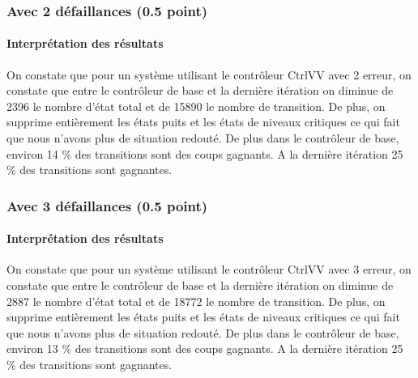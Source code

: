 \documentclass[a4paper]{book}
\begin{document}
\subsubsection{Avec 2 défaillances (0.5 point)}




%
\paragraph{Interprétation des résultats}
\begin{flushleft}
    On constate que pour un système utilisant le contrôleur CtrlVV avec 2 erreur, on constate que entre le contrôleur de base et la dernière itération on diminue de 2396 le nombre d'état total
    et de 15890 le nombre de transition. De plus, on supprime entièrement les états puits et les états de niveaux critiques ce qui fait que nous n'avons plus de situation redouté. 
    De plus dans le contrôleur de base, environ 14 \% des transitions sont des coups gagnants.
    A la dernière itération 25 \% des transitions sont gagnantes.
    
\end{flushleft}

\subsubsection{Avec 3 défaillances (0.5 point)}




%
\paragraph{Interprétation des résultats}
\begin{flushleft}
    On constate que pour un système utilisant le contrôleur CtrlVV avec 3 erreur, on constate que entre le contrôleur de base et la dernière itération on diminue de 2887 le nombre d'état total
    et de 18772 le nombre de transition. De plus, on supprime entièrement les états puits et les états de niveaux critiques ce qui fait que nous n'avons plus de situation redouté. 
    De plus dans le contrôleur de base, environ 13 \% des transitions sont des coups gagnants.
    A la dernière itération 25 \% des transitions sont gagnantes.
    
\end{flushleft}
\end{document}
